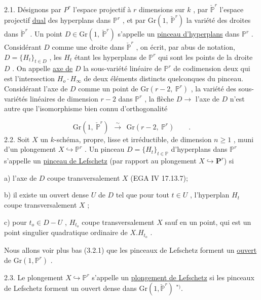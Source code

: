 2.1.    Désignons par $P^r$ l'espace projectif à $r$ dimensions sur $k$ , par $\check{\mathbb{P}}^r$ l'espace projectif \underline{dual} des hyperplans dans $\mathbb{P}^r$ , et par $\mathrm{Gr}(1,\ \check{\mathbb{P}}^r)$ la variété des droites dans $\check{\mathbb{P}}^r$ . Un point $D \in \mathrm{Gr}(1,\ \check{\mathbb{P}}^r)$ s'appelle un \underline{pinceau d'hyperplans} dans $\mathbb{P}^r$ . Considérant $D$ comme une droite dans $\check{\mathbb{P}}^r$ , on écrit, par abus de notation, $D = \{H_t\}_{t \in D}$ , les $H_t$ étant les hyperplans de $\mathbb{P}^r$ qui sont les points de la droite $D$ . On appelle \underline{axe de} $D$ la sous-variété linéaire de $\mathbb{P}^r$ de codimension deux qui est l'intersection $H_o \cdot H_\infty$ de deux éléments distincts quelconques du pinceau. Considérant l'axe de $D$ comme un point de $\mathrm{Gr}(r-2,\ \mathbb{P}^r)$ , la variété des sous-variétés linéaires de dimension $r-2$ dans $\mathbb{P}^r$ , la flèche $D \longrightarrow$ l'axe de $D$ n'est autre que l'isomorphisme bien connu d'orthogonalité

\begin{equation*}
\mathrm{Gr}(1,\ \check{\mathbb{P}}^r) \ \ \stackrel{\textstyle\sim}{\longrightarrow} \ \ \mathrm{Gr}(r-2,\ \mathbb{P}^r) \qquad .
\end{equation*}
2.2.    Soit $X$ un $k$-schéma, propre, lisse et irréductible, de dimension $n \geq 1$ , muni d'un plongement $X \hookrightarrow \mathbb{P}^r$ . Un pinceau $D = \{H_t\}_{t \in \mathbb{P}}$ d'hyperplans dans $\mathbb{P}^r$ s'appelle un \underline{pinceau de Lefschetz}   (par rapport au plongement  $X \hookrightarrow \mathbf{P}^r$) si

a) l'axe de $D$ coupe transversalement $X$  (EGA IV 17.13.7);

b) il existe un ouvert dense $U$ de $D$ tel que pour tout $t \in U$ , l'hyperplan $H_t$ coupe transversalement $X$ ;

c) pour $t_o \in D-U$ , $H_{t_o}$ coupe transversalement $X$ sauf en
un point, qui est un point singulier quadratique ordinaire de  $X . H_{t_o}$  .

Nous allons voir plus bas (3.2.1) que les pinceaux de Lefschetz forment un  \underline{ouvert}  de  $\mathrm{Gr}(1, \mathbb{P}^r)$  .

2.3.    Le plongement  $X \hookrightarrow \mathbb{P}^r$  s'appelle un  \underline{plongement de Lefschetz} si les pinceaux de Lefschetz forment un ouvert dense dans $\mathrm{Gr}(1, \check{\mathbb{P}}^r)$ $^{*)}$.

